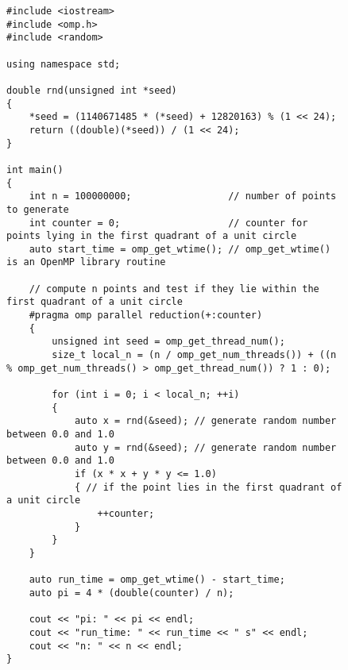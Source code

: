 \documentclass[../../main.tex]{subfiles}
\begin{document}
\newpage
\begin{figure}
\label{fig:calculate_pi_v2}
\begin{lstlisting}
#include <iostream>
#include <omp.h>
#include <random>

using namespace std;

double rnd(unsigned int *seed)
{
    *seed = (1140671485 * (*seed) + 12820163) % (1 << 24);
    return ((double)(*seed)) / (1 << 24);
}

int main()
{
    int n = 100000000;                 // number of points to generate
    int counter = 0;                   // counter for points lying in the first quadrant of a unit circle
    auto start_time = omp_get_wtime(); // omp_get_wtime() is an OpenMP library routine

    // compute n points and test if they lie within the first quadrant of a unit circle
    #pragma omp parallel reduction(+:counter)
    {
        unsigned int seed = omp_get_thread_num();
        size_t local_n = (n / omp_get_num_threads()) + ((n % omp_get_num_threads() > omp_get_thread_num()) ? 1 : 0);

        for (int i = 0; i < local_n; ++i)
        {
            auto x = rnd(&seed); // generate random number between 0.0 and 1.0
            auto y = rnd(&seed); // generate random number between 0.0 and 1.0
            if (x * x + y * y <= 1.0)
            { // if the point lies in the first quadrant of a unit circle
                ++counter;
            }
        }
    }

    auto run_time = omp_get_wtime() - start_time;
    auto pi = 4 * (double(counter) / n);

    cout << "pi: " << pi << endl;
    cout << "run_time: " << run_time << " s" << endl;
    cout << "n: " << n << endl;
}
\end{lstlisting}
\end{figure}
\end{document}
